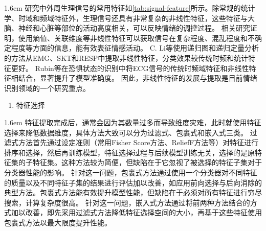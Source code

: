 \hangindent 1.6em
研究中外周生理信号的常用特征如\autoref{tab:signal-feature}所示。除常规的统计学、时域和频域特征外，生理信号还具有非常复杂的非线性特征，这些特征与大脑、神经和心脏等部位的活动高度相关，可以反映情绪的调控过程。
相关研究证明\cite{Valenza2012,Khaliliardali2015}，使用熵值、关联维度等非线性特征可以获取信号在复杂程度、混乱程度和不确定程度等方面的信息，能有效表征情感活动。
C. Li等\cite{LiCailong2018}使用递归图和递归定量分析的方法从EMG、SKT和RESP中提取非线性特征，分类效果较传统时频和统计特征更好。
Rubin等\cite{Rubin2016}在恐惧状态的识别中将ECG信号的传统时频域特征和非线性特征相结合，显著提升了模型准确度。
因此，非线性特征的发展与提取是目前情绪识别领域的一个研究重点。

\begin{enumerate}[\qquad(2)]
    \item 特征选择
\end{enumerate}

\hangindent 1.6em
特征提取完成后，通常会因为其数量过多而导致维度灾难，此时就使用特征选择来降低数据维度，具体方法大致可以分为过滤式、包裹式和嵌入式三类。
过滤式方法首先通过设定准则（常用Fisher Score方法\cite{Boonthong2015}、ReliefF方法\cite{ZhangJianhai2015}等）对特征进行排序和选择，然后再训练模型，特征选择过程与后续模型训练无关，选择的是原特征集的子特征集。这种方法较为简便，但缺陷在于它忽视了被选择的特征子集对于分类器性能的影响。
针对这一问题，包裹式方法通过使用一个分类器对不同特征的质量以及不同特征子集的结果进行评估加以改善，如应用前向选择与后向消除的典型方法。包裹式方法能有效提升模型性能，但缺陷在于必须对所有特征进行穷尽搜索，计算复杂度很高。
针对这一问题，嵌入式方法通过将前两种方法结合的方式加以改善，即先采用过滤式方法降低特征选择空间的大小，再基于这些特征使用包裹式方法以最大限度提升性能。

